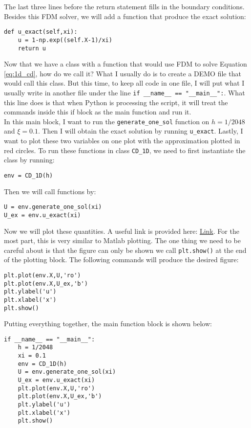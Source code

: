 \documentclass{article}
\begin{document}
The last three lines before the return statement fills in the boundary conditions. Besides this FDM solver, we will add a function that produce the exact solution:
\begin{lstlisting}
def u_exact(self,xi):
	u = 1-np.exp((self.X-1)/xi)
	return u
\end{lstlisting}

Now that we have a class with a function that would use FDM to solve Equation \ref{eq:1d_cd}, how do we call it? What I usually do is to create a DEMO file that would call this class. But this time, to keep all code in one file, I will put what I usually write in another file under the line \texttt{if \_\_name\_\_ == "\_\_main\_\_":}. What this line does is that when Python is processing the script, it will treat the commands inside this if block as the main function and run it. \\

In this main block, I want to run the \texttt{generate\_one\_sol} function on $h=1/2048$ and $\xi=0.1$. Then I will obtain the exact solution by running \texttt{u\_exact}. Lastly, I want to plot these two variables on one plot with the approximation plotted in red circles. To run these functions in class \texttt{CD\_1D}, we need to first instantiate the class by running:
\begin{center}
\texttt{env = CD\_1D(h)}
\end{center}

Then we will call functions by:
\begin{center}
\texttt{U = env.generate\_one\_sol(xi)}\\
\texttt{U\_ex = env.u\_exact(xi)}
\end{center}

Now we will plot these quantities. A useful link is provided here: \href{https://matplotlib.org/tutorials/introductory/pyplot.html}{Link}. For the most part, this is very similar to Matlab plotting. The one thing we need to be careful about is that the figure can only be shown we call \texttt{plt.show()} at the end of the plotting block. The following commands will produce the desired figure:
\begin{lstlisting}
plt.plot(env.X,U,'ro')
plt.plot(env.X,U_ex,'b')
plt.ylabel('u')
plt.xlabel('x')
plt.show()
\end{lstlisting}

Putting everything together, the main function block is shown below:
\begin{lstlisting}
if __name__ == "__main__":
	h = 1/2048
	xi = 0.1
	env = CD_1D(h)
	U = env.generate_one_sol(xi)
	U_ex = env.u_exact(xi)
	plt.plot(env.X,U,'ro')
	plt.plot(env.X,U_ex,'b')
	plt.ylabel('u')
	plt.xlabel('x')
	plt.show()
\end{lstlisting}
\end{document}
